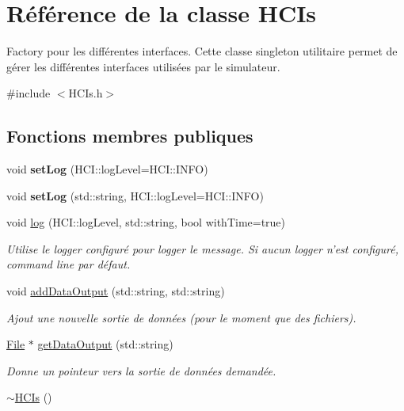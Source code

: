 \hypertarget{classHCIs}{\section{Référence de la classe H\-C\-Is}
\label{classHCIs}
}


Factory pour les différentes interfaces. Cette classe singleton utilitaire permet de gérer les différentes interfaces utilisées par le simulateur.  




{\ttfamily \#include $<$H\-C\-Is.\-h$>$}

\subsection*{Fonctions membres publiques}
\begin{DoxyCompactItemize}
\item 
\hypertarget{classHCIs_a890eb6e73b42101e282cb86474f97ca2}{void {\bfseries set\-Log} (H\-C\-I\-::log\-Level=H\-C\-I\-::\-I\-N\-F\-O)}\label{classHCIs_a890eb6e73b42101e282cb86474f97ca2}

\item 
\hypertarget{classHCIs_a9e3e7099368ff5916e2d87d7741fc66a}{void {\bfseries set\-Log} (std\-::string, H\-C\-I\-::log\-Level=H\-C\-I\-::\-I\-N\-F\-O)}\label{classHCIs_a9e3e7099368ff5916e2d87d7741fc66a}

\item 
\hypertarget{classHCIs_a29a701816f31e573013052410beb6a82}{void \hyperlink{classHCIs_a29a701816f31e573013052410beb6a82}{log} (H\-C\-I\-::log\-Level, std\-::string, bool with\-Time=true)}\label{classHCIs_a29a701816f31e573013052410beb6a82}

\begin{DoxyCompactList}\small\item\em Utilise le logger configuré pour logger le message. Si aucun logger n'est configuré, command line par défaut. \end{DoxyCompactList}\item 
void \hyperlink{classHCIs_afeb0ee7efd2c14dfded566aacb9dc615}{add\-Data\-Output} (std\-::string, std\-::string)
\begin{DoxyCompactList}\small\item\em Ajout une nouvelle sortie de données (pour le moment que des fichiers). \end{DoxyCompactList}\item 
\hyperlink{classFile}{File} $\ast$ \hyperlink{classHCIs_a15b2703edaaf748e452e9d4df4262465}{get\-Data\-Output} (std\-::string)
\begin{DoxyCompactList}\small\item\em Donne un pointeur vers la sortie de données demandée. \end{DoxyCompactList}\item 
\hypertarget{classHCIs_a63d976a06cf358efc31a2692b54a2d45}{\hyperlink{classHCIs_a63d976a06cf358efc31a2692b54a2d45}{$\sim$\-H\-C\-Is} ()}\label{classHCIs_a63d976a06cf358efc31a2692b54a2d45}


\end{DoxyCompactItemize}
